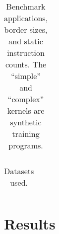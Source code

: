 \begin{table}
\footnotesize
\centering
\begin{tabular}{| l | l | l | l | l | l |}
\hline

\hline
\end{tabular}
\caption{%
  Benchmark applications, border sizes, and static instruction counts.
  The ``simple'' and ``complex'' kernels are synthetic training
  programs. %
}
\label{tab:benchmarks}
\end{table}

\begin{table}
\footnotesize
\centering
\begin{tabular}{| l | l | l | l |}
\hline

\hline
\end{tabular}
\caption{%
  Datasets used.%
}
\label{tab:datasets}
\end{table}

\section{Results}


\clearpage
\begin{appendices}
\end{appendices}


